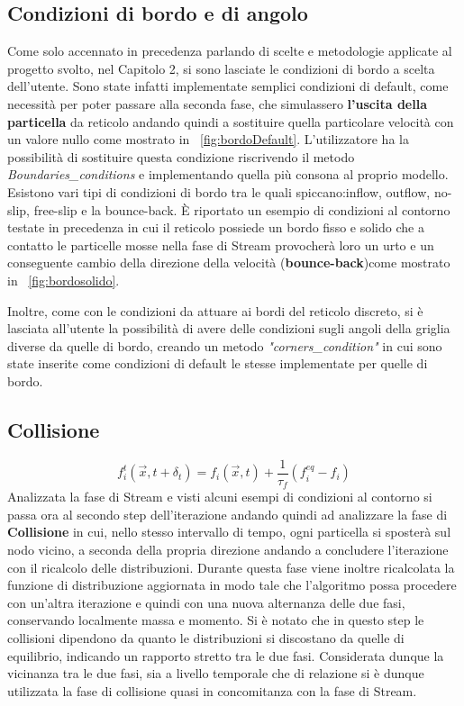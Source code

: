 {\subsection{Condizioni di bordo e di angolo}
Come solo accennato in precedenza parlando di scelte e metodologie applicate al progetto svolto, nel Capitolo 2, si sono lasciate le condizioni di bordo a scelta dell'utente. Sono state infatti implementate semplici condizioni di default, come necessit\`a per poter passare alla seconda fase, che simulassero \textbf{l'uscita della particella} da reticolo andando quindi a sostituire quella particolare velocit\`a con un valore nullo come mostrato in \figurename~\ref{fig:bordoDefault}. L'utilizzatore ha la possibilit\`a di sostituire questa condizione riscrivendo il metodo \textit{Boundaries\_conditions} e implementando quella pi\`u consona al proprio modello. Esistono vari tipi di condizioni di bordo tra le quali spiccano:inflow, outflow, no-slip, free-slip e la bounce-back. \`E riportato un esempio di condizioni al contorno testate in precedenza in cui il reticolo possiede un bordo fisso e solido che a contatto le particelle mosse nella fase di Stream provocher\`a loro un urto e un conseguente cambio della direzione della velocit\`a (\textbf{bounce-back})come mostrato in \figurename~\ref{fig:bordosolido}.

Inoltre, come con le condizioni da attuare ai bordi del reticolo discreto, si \`e lasciata all'utente la possibilit\`a di avere delle condizioni sugli angoli della griglia diverse da quelle di bordo, creando un metodo \textit{"corners\_condition"} in cui sono state inserite come condizioni di default le stesse implementate per quelle di bordo.
\subsection{Collisione}

$$ f_{i}^{t}({\vec {x}},t+\delta _{t})=f_{i}({\vec {x}},t)+{\frac {1}{\tau _{f}}}(f_{i}^{eq}-f_{i})$$
Analizzata la fase di Stream e visti alcuni esempi di condizioni al contorno si passa ora al secondo step dell'iterazione andando quindi ad analizzare la fase di \textbf{Collisione} in cui, nello stesso intervallo di tempo, ogni particella si sposter\`a sul nodo vicino, a seconda della propria direzione andando a concludere l'iterazione con il ricalcolo delle distribuzioni. Durante questa fase viene inoltre ricalcolata la funzione di distribuzione aggiornata in modo tale che l'algoritmo possa procedere con un'altra iterazione e quindi con una nuova alternanza delle due fasi, conservando localmente massa e momento. Si \`e notato che in questo step le collisioni dipendono da quanto le distribuzioni si discostano da quelle di equilibrio, indicando un rapporto stretto tra le due fasi. Considerata dunque la vicinanza tra le due fasi, sia a livello temporale che di relazione si \`e dunque utilizzata la fase di collisione quasi in concomitanza con la fase di Stream.

}
